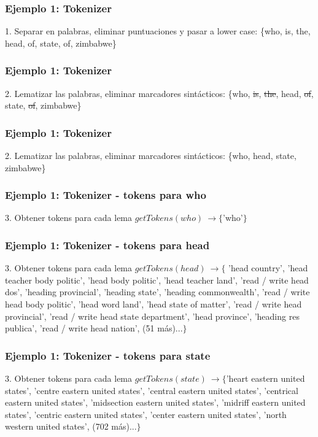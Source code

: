 \begin{frame}[t]
\frametitle{Ejemplo 1: Tokenizer}
1. Separar en palabras, eliminar puntuaciones y pasar a lower case:\newline
  \Large{\{{\color{blue}w}ho, is, the, head, of, state, of, {\color{blue}z}imbabwe\}}
\end{frame}
\begin{frame}[t]
\frametitle{Ejemplo 1: Tokenizer}
2. Lematizar las palabras, eliminar marcadores sintácticos:\newline
  \Large{\{who, {\color{red}\st{is}}, {\color{red}\st{the}}, head, {\color{red}\st{of}}, state, {\color{red}\st{of}}, zimbabwe\}}
\end{frame}

\begin{frame}[t]
\frametitle{Ejemplo 1: Tokenizer}
2. Lematizar las palabras, eliminar marcadores sintácticos:\newline
  \Large{\{who, head, state, zimbabwe\}}
\end{frame}

\begin{frame}[t]
\frametitle{Ejemplo 1: Tokenizer - tokens para who}
3. Obtener tokens para cada lema \newline
    \Large{$getTokens(who)\ \rightarrow \{$'who'$\}$}
\end{frame}

\begin{frame}[t]
\frametitle{Ejemplo 1: Tokenizer - tokens para head}
3. Obtener tokens para cada lema \newline
    \Large{$
    getTokens(head)\ \rightarrow \{$ 'head country', 'head teacher body politic', 'head body politic', 'head teacher land', 'read / write head dos', 'heading provincial', 'heading state', 'heading commonwealth', 'read / write head body politic', 'head word land', 'head state of matter', 'read / write head provincial', 'read / write head state department', 'head province',  'heading res publica', 'read / write head nation', (51 más)...$\}$}
\end{frame}

\begin{frame}[t]
\frametitle{Ejemplo 1: Tokenizer - tokens para state}
3. Obtener tokens para cada lema \newline
  \Large{ $getTokens(state)\ \rightarrow  \{$'heart eastern united states', 'centre eastern united states', 'central eastern united states', 'centrical eastern united states', 'midsection eastern united states', 'midriff eastern united states', 'centric eastern united states', 'center eastern united states', 'north western united states', (702 más)...$\}$}
\end{frame}

